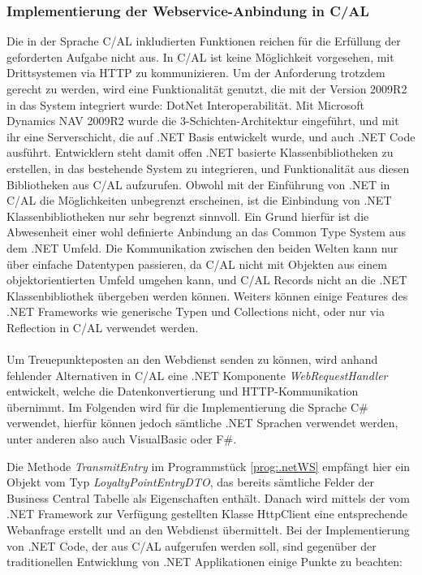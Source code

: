 \subsubsection{Implementierung der Webservice-Anbindung in C/AL}
Die in der Sprache C/AL inkludierten Funktionen reichen für die Erfüllung der geforderten Aufgabe nicht aus. In C/AL ist keine Möglichkeit vorgesehen, mit Drittsystemen via HTTP zu kommunizieren. Um der Anforderung trotzdem gerecht zu werden, wird eine Funktionalität genutzt, die mit der Version 2009R2 in das System integriert wurde: DotNet Interoperabilität. Mit Microsoft Dynamics NAV 2009R2 wurde die 3-Schichten-Architektur eingeführt, und mit ihr eine Serverschicht, die auf .NET Basis entwickelt wurde, und auch .NET Code ausführt. Entwicklern steht damit offen .NET basierte Klassenbibliotheken zu erstellen, in das bestehende System zu integrieren, und Funktionalität aus diesen Bibliotheken aus C/AL aufzurufen. Obwohl mit der Einführung von .NET in C/AL die Möglichkeiten unbegrenzt erscheinen, ist die Einbindung von .NET Klassenbibliotheken nur sehr begrenzt sinnvoll. Ein Grund hierfür ist die Abwesenheit einer wohl definierte Anbindung an das Common Type System aus dem .NET Umfeld. Die Kommunikation zwischen den beiden Welten kann nur über einfache Datentypen passieren, da C/AL nicht mit Objekten aus einem objektorientierten Umfeld umgehen kann, und C/AL Records nicht an die .NET Klassenbibliothek übergeben werden können. Weiters können einige Features des .NET Frameworks wie generische Typen und Collections nicht, oder nur via Reflection in C/AL verwendet werden. 
\paragraph{}

Um Treuepunkteposten an den Webdienst senden zu können, wird anhand fehlender Alternativen in C/AL eine .NET Komponente \textit{WebRequestHandler} entwickelt, welche die Datenkonvertierung und HTTP-Kommunikation übernimmt. Im Folgenden wird für die Implementierung die Sprache C\# verwendet, hierfür können jedoch sämtliche .NET Sprachen verwendet werden, unter anderen also auch VisualBasic oder F\#.
\pagebreak

Die Methode \textit{TransmitEntry} im Programmstück \ref{prog:.netWS} empfängt hier ein Objekt vom Typ \textit{LoyaltyPointEntryDTO}, das bereits sämtliche Felder der Business Central Tabelle als Eigenschaften enthält. Danach wird mittels der vom .NET Framework zur Verfügung gestellten Klasse HttpClient eine entsprechende Webanfrage erstellt und an den Webdienst übermittelt. Bei der Implementierung von .NET Code, der aus C/AL aufgerufen werden soll, sind gegenüber der traditionellen Entwicklung von .NET Applikationen einige Punkte zu beachten:

